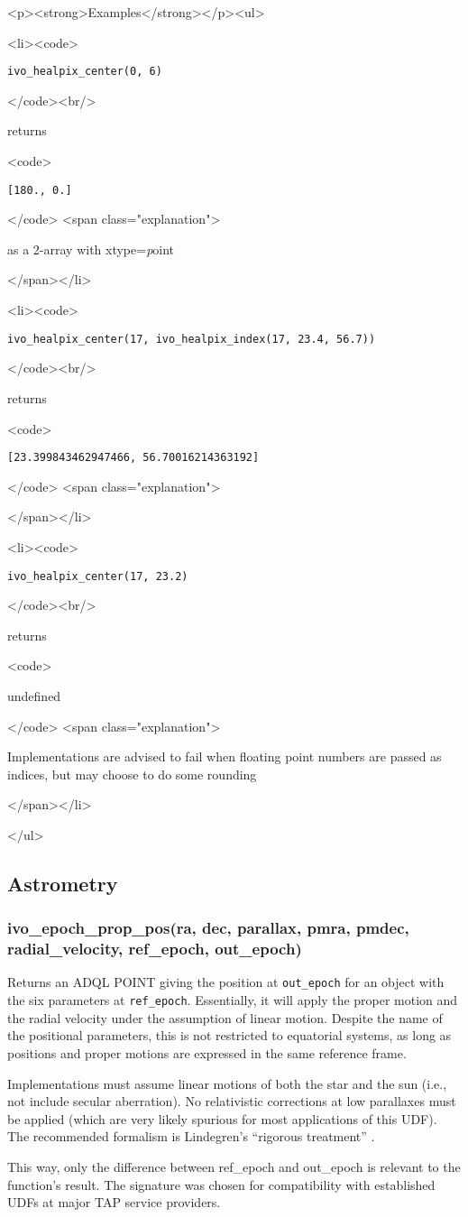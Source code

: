 \documentclass[11pt,a4paper]{ivoa}
\newenvironment{examples}%
{\begin{html}<p><strong>Examples</strong></p><ul>\end{html}%
  \def\example{\begin{html}<li><code>\end{html}}%
  \def\becomes{\begin{html}</code><br/>\end{html} returns
    \begin{html}<code>\end{html}}%
  \def\done##1.{\begin{html}</code> <span class="explanation">\end{html}
    ##1
    \begin{html}</span></li>\end{html}}}%
{\begin{html}</ul>\end{html}}
\begin{document}
\begin{examples}
\example \verb|ivo_healpix_center(0, 6)|
\becomes \verb|[180., 0.]|
\done as a 2-array with \xmlel{xtype}=\emph{point}.

\example \verb|ivo_healpix_center(17, ivo_healpix_index(17, 23.4, 56.7))|
\becomes \verb|[23.399843462947466, 56.70016214363192]|
\done.

\example \verb|ivo_healpix_center(17, 23.2)|
\becomes undefined
\done Implementations are advised to fail when floating point numbers
are passed as indices, but may choose to do some rounding.
\end{examples}


\subsection{Astrometry}

\subsubsection{ivo\_epoch\_prop\_pos(ra, dec, parallax, pmra, pmdec,\\
  radial\_velocity, ref\_epoch, out\_epoch)}
\label{epoch_prop_pos}

Returns an ADQL POINT giving the position at \texttt{out\_epoch} for an
object with the six parameters at \texttt{ref\_epoch}. Essentially, it
will apply the proper motion and the radial velocity under the
assumption of linear motion.  Despite the name of the positional
parameters, this is not restricted to equatorial systems, as long as
positions and proper motions are expressed in the same reference frame.

Implementations must assume linear motions of both the star and the sun
(i.e., not include secular aberration).  No relativistic corrections at
low parallaxes must be applied (which are very likely spurious for most
applications of this UDF).  The recommended formalism is Lindegren's
``rigorous treatment'' \citep{1997ESASP1200.....E}.

This way, only the difference between ref\_epoch and out\_epoch is
relevant to the function's result.  The signature was chosen for
compatibility with established UDFs at major TAP service providers.
\end{document}
